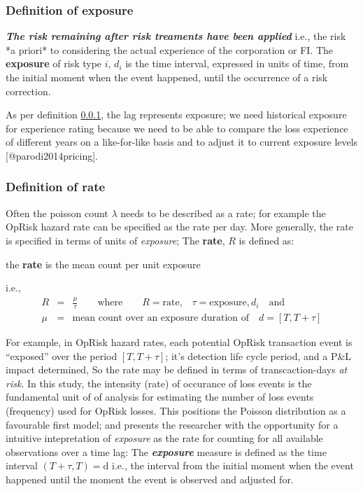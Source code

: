 \documentclass[
]{article}
\begin{document}
\subsubsection{Definition of exposure}
\label{sssec:Definition of exposure}
\begin{definition}
\emph{\textbf{The risk remaining after risk treaments have been applied}} i.e., the risk *a priori* to considering the actual experience of the corporation or FI. The  \textbf{exposure} of risk type $i$, $d_{i}$ is the time interval, expressed in units of time, from the initial moment when the event happened, until the occurrence of a risk correction.
\end{definition}

As per definition \ref{sssec:Definition of exposure}, the lag represents
exposure; we need historical exposure for experience rating because we
need to be able to compare the loss experience of different years on a
like-for-like basis and to adjust it to current exposure levels
{[}@parodi2014pricing{]}.

\subsubsection{Definition of rate}
\label{sssec:Definition of rate}

Often the poisson count \(\lambda\) needs to be described as a rate; for
example the OpRisk hazard rate can be specified as the rate per day.
More generally, the rate is specified in terms of units of
\emph{exposure}; The \textbf{rate}, \(R\) is defined as:\medskip

\begin{definition}
the \textbf{rate} is the mean count per unit exposure
\end{definition}

i.e., \singlespacing \begin{eqnarray}
R &=& \frac{\mu}{\tau} \qquad \mbox{where} \qquad R = \mbox{rate,} \quad \tau = \mbox{exposure},d_{i}\quad \mbox{and}\nonumber\\
\mu &=& \mbox{mean count over an exposure duration of} \quad d = [T,T+\tau] \nonumber
\end{eqnarray} \doublespacing

For example, in OpRisk hazard rates, each potential OpRisk transaction
event is ``exposed'' over the period \([T,T+\tau]\); it's detection life
cycle period, and a P\&L impact determined, So the rate may be defined
in terms of transcaction-days \emph{at risk}. In this study, the
intensity (rate) of occurance of loss events is the fundamental unit of
of analysis for estimating the number of loss events (frequency) used
for OpRisk losses. This positions the Poisson distribution as a
favourable first model; and presents the researcher with the opportunity
for a intuitive intepretation of \emph{exposure} as the rate for
counting for all available observations over a time lag: The
\emph{\textbf{exposure}} measure is defined as the time interval
\((T+\tau,T) = \mbox{d}\) i.e., the interval from the initial moment
when the event happened until the moment the event is observed and
adjusted for.\medskip
\end{document}
